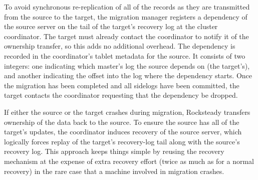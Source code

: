 To avoid synchronous re-replication of all of the records as they are
transmitted from the source to the target, the migration manager
registers a dependency of the source server on the tail of the target's
recovery log at the cluster coordinator. The target must already contact the
coordinator to notify it of the ownership transfer, so this adds no additional
overhead.  The dependency is recorded in the coordinator's tablet metadata for
the source. It consists of two integers: one indicating which
master's log the source depends on (the target's), and another indicating the offset
into the log where the dependency starts. Once the migration has been completed
and all sidelogs have been committed, the target contacts the
coordinator requesting that the dependency be dropped.

If either the source or the target crashes during migration, Rocksteady
transfers ownership of the data back to the source.  To ensure the source has
all of the target's updates, the coordinator induces recovery of the source
server, which logically forces replay of the target's recovery-log tail along
with the source's recovery log. This approach keeps things simple by reusing
the recovery mechanism at the expense of extra recovery effort (twice as much
as for a normal recovery) in the rare case that a machine involved in
migration crashes.
